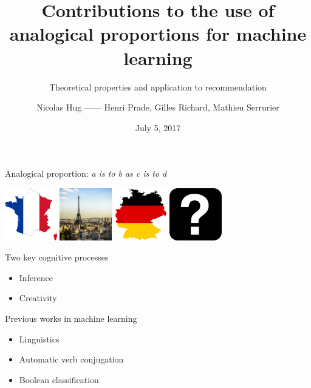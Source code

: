 \documentclass{beamer}
\title{Contributions to the use of analogical proportions for machine learning}
\subtitle{Theoretical properties and application to recommendation}
\date{July 5, 2017}
\author{Nicolas Hug  ------ Henri Prade, Gilles Richard, Mathieu Serrurier}
\institute{Université Toulouse Paul Sabatier}
\begin{document}
\maketitle

\begin{frame}{Analogical proportion: \textit{a is to b as c is to d}}
  \begin{center}
  \includegraphics[width=0.17\textwidth]{figures/france.png}
  \includegraphics[width=0.17\textwidth]{figures/paris.jpg}
  \includegraphics[width=0.17\textwidth]{figures/germany.png}
  \includegraphics[width=0.17\textwidth]{figures/question-mark.jpg}
  \end{center}
  \begin{block}{Two key cognitive processes}
    \begin{itemize}
    \item Inference
    \item Creativity
    \end{itemize}
  \end{block}
  \begin{block}{Previous works in machine learning}
    \begin{itemize}
      \item Linguistics \cite{Lep03}
      \item Automatic verb conjugation \cite{StrYvoREPORT05}
      \item Boolean classification \cite{BayMicDelIJCAI07}
    \end{itemize}
  \end{block}
\end{frame}
\end{document}
